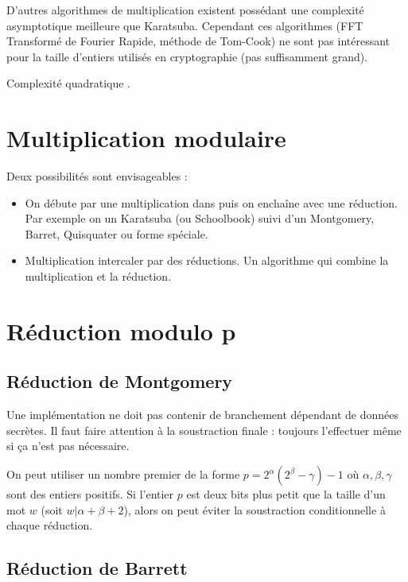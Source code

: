 D'autres algorithmes de multiplication existent possédant une complexité asymptotique meilleure que Karatsuba. Cependant ces algorithmes (FFT Transformé de Fourier Rapide, méthode de Tom-Cook) ne sont pas intéressant pour la taille d'entiers utilisés en cryptographie (pas suffisamment grand). 

Complexité quadratique .


\section{Multiplication modulaire}
Deux possibilités sont envisageables : 
\begin{itemize}
    \item On débute par une multiplication dans \Z{} puis on enchaîne avec une réduction. Par exemple on un Karatsuba (ou Schoolbook) suivi d'un Montgomery, Barret, Quisquater ou forme spéciale.
    \item Multiplication intercaler par des réductions. Un algorithme qui combine la multiplication et la réduction.
\end{itemize}

\section{Réduction modulo p}
\subsection{Réduction de Montgomery}
Une implémentation ne doit pas contenir de branchement dépendant de données secrètes. Il faut faire attention à la soustraction finale : toujours l'effectuer même si ça n'est pas nécessaire.

On peut utiliser un nombre premier de la forme $p = 2^\alpha(2^\beta - \gamma) - 1$ où $\alpha, \beta, \gamma$ sont des entiers positifs. Si l'entier $p$ est deux bits plus petit que la taille d'un mot $w$ (soit $w | \alpha + \beta + 2$), alors on peut éviter la soustraction conditionnelle à chaque réduction. 

\subsection{Réduction de Barrett}

